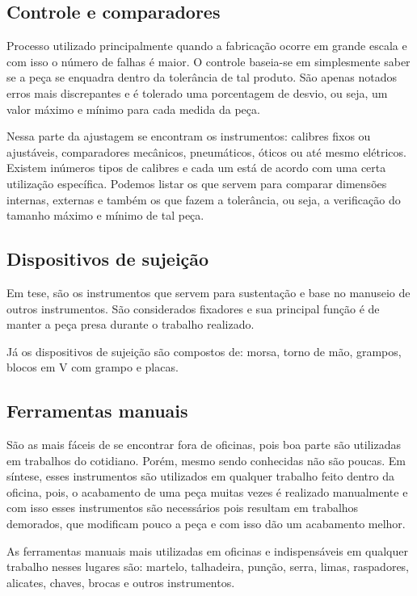\documentclass[
	12pt,				%
	oneside,			%
	a4paper,			%
	english,			%
	french,				%
	spanish,			%
	brazil,				%
	]{abntex2}
\begin{document}
\subsection{Controle e comparadores}

Processo utilizado principalmente quando a fabricação ocorre em grande escala e com isso o número de falhas é maior. O controle baseia-se em simplesmente saber se a peça se enquadra dentro da tolerância de tal produto. São apenas notados erros mais discrepantes e é tolerado uma porcentagem de desvio, ou seja, um valor máximo e mínimo para cada medida da peça.

Nessa parte da ajustagem se encontram os instrumentos: calibres fixos ou ajustáveis, comparadores mecânicos, pneumáticos, óticos ou até mesmo elétricos. Existem inúmeros tipos de calibres e cada um está de acordo com uma certa utilização específica. Podemos listar os que servem para comparar dimensões internas, externas e também os que fazem a tolerância, ou seja, a verificação do tamanho máximo e mínimo de tal peça.

\subsection{Dispositivos de sujeição}

Em tese, são os instrumentos que servem para sustentação e base no manuseio de outros instrumentos. São considerados fixadores e sua principal função é de manter a peça presa durante o trabalho realizado.

Já os dispositivos de sujeição são compostos de: morsa, torno de mão, grampos, blocos em V com grampo e placas.

\subsection{Ferramentas manuais}

São as mais fáceis de se encontrar fora de oficinas, pois boa parte são utilizadas em trabalhos do cotidiano. Porém, mesmo sendo conhecidas não são poucas. Em síntese, esses instrumentos são utilizados em qualquer trabalho feito dentro da oficina, pois, o acabamento de uma peça muitas vezes é realizado manualmente e com isso esses instrumentos são necessários pois resultam em trabalhos demorados, que modificam pouco a peça e com isso dão um acabamento melhor.

As ferramentas manuais mais utilizadas em oficinas e indispensáveis em qualquer trabalho nesses lugares são: martelo, talhadeira, punção, serra, limas, raspadores, alicates, chaves, brocas e outros instrumentos.
\end{document}
